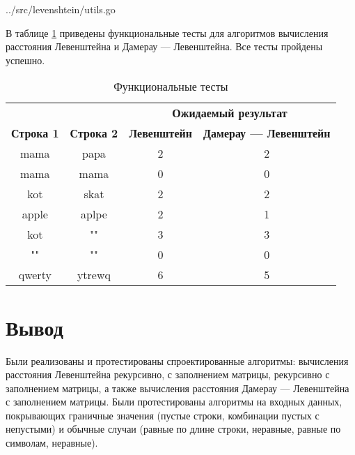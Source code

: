 \begin{lstinputlisting}[
	caption={Вспомогательные функции и типы данных},
	label={lst:levenshtein_utils},
	style=go
	]{../src/levenshtein/utils.go}
\end{lstinputlisting}

\clearpage

В таблице \ref{tabular:functional_test} приведены функциональные тесты для алгоритмов вычисления расстояния Левенштейна и Дамерау — Левенштейна. Все тесты пройдены успешно.

\begin{table}[h]
	\begin{center}
		\caption{\label{tabular:functional_test} Функциональные тесты}
		\begin{tabular}{|c|c|c|c|}
			\hline
			&& \multicolumn{2}{c|}{\bfseries Ожидаемый результат}\\ \cline{3-4}
			\bfseries Строка 1 & \bfseries Строка 2 & \bfseries Левенштейн & \bfseries Дамерау — Левенштейн\\
			\hline
			mama&	papa&	2&	2\\
			\hline
			mama & mama & 0& 0\\
			\hline
			kot & skat & 2 & 2\\
			\hline
			apple & aplpe & 2 & 1\\
			\hline
			kot & "" & 3 & 3\\
			\hline
			"" & "" & 0 & 0\\
			\hline
			qwerty & ytrewq & 6 & 5\\
			\hline
		\end{tabular}
	\end{center}
\end{table}


\section{Вывод}

Были реализованы и протестированы спроектированные алгоритмы: вычисления расстояния Левенштейна рекурсивно, с заполнением матрицы, рекурсивно с заполнением матрицы, а также вычисления расстояния Дамерау — Левенштейна с заполнением матрицы.
Были протестированы алгоритмы на входных данных, покрывающих граничные значения (пустые строки, комбинации пустых с непустыми) и обычные случаи (равные по длине строки, неравные, равные по символам, неравные).
